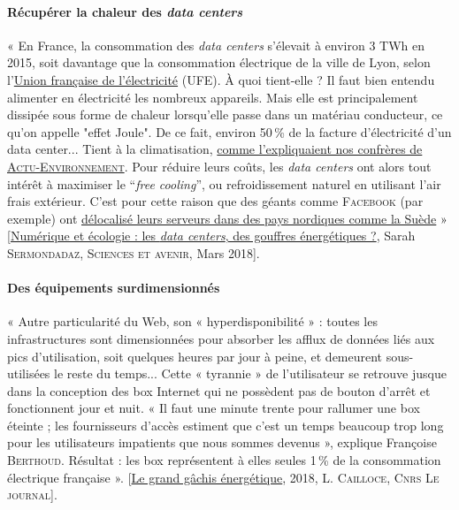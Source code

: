 \paragraph{Récupérer la chaleur des \textit{data centers}}
« En France, la consommation des \textit{data centers} s'élevait à environ 3 TWh en 2015, soit davantage que la consommation électrique de la ville de Lyon, selon l'\href{https://ufe-electricite.fr/}{Union française de l'électricité} (UFE). À quoi tient-elle ? Il faut bien entendu alimenter en électricité les nombreux appareils. Mais elle est principalement dissipée sous forme de chaleur lorsqu'elle passe dans un matériau conducteur, ce qu'on appelle "effet Joule". De ce fait, environ 50\,\% de la facture d'électricité d'un data center... Tient à la climatisation, \href{https://www.actu-environnement.com/ae/dossiers/efficacite-energetique/data-centers-reduire-facture-energetique-rester-competitifs.php}{comme l'expliquaient nos confrères de \textsc{Actu-Environnement}}. Pour réduire leurs coûts, les \textit{data centers} ont alors tout intérêt à maximiser le “\textit{free cooling}”, ou refroidissement naturel en utilisant l'air frais extérieur. C'est pour cette raison que des géants comme \textsc{Facebook} (par exemple) ont \href{https://www.sciencesetavenir.fr/decryptage/pourquoi-les-centres-de-traitement-des-donnees-migrent-ils-au-nord_37030}{délocalisé leurs serveurs dans des pays nordiques comme la Suède} » [\href{https://www.sciencesetavenir.fr/high-tech/informatique/numerique-et-ecologie-les-data-centers-des-gouffres-energetiques_121838}{Numérique et écologie : les \textit{data centers}, des gouffres énergétiques ?}, Sarah \textsc{Sermondadaz}, \textsc{Sciences et avenir}, Mars 2018].

\paragraph{Des équipements surdimensionnés}
« Autre particularité du Web, son « hyperdisponibilité » : toutes les infrastructures sont dimensionnées pour absorber les afflux de données liés aux pics d’utilisation, soit quelques heures par jour à peine, et demeurent sous-utilisées le reste du temps... Cette « tyrannie » de l’utilisateur se retrouve jusque dans la conception des box Internet qui ne possèdent pas de bouton d’arrêt et fonctionnent jour et nuit. « Il faut une minute trente pour rallumer une box éteinte ; les fournisseurs d’accès estiment que c’est un temps beaucoup trop long pour les utilisateurs impatients que nous sommes devenus », explique Françoise \textsc{Berthoud}. Résultat : les box représentent à elles seules 1\,\% de la consommation électrique française ». [\href{https://lejournal.cnrs.fr/articles/numerique-le-grand-gachis-energetique}{Le grand gâchis énergétique}, 2018, L. \textsc{Cailloce}, \textsc{Cnrs Le journal}].

